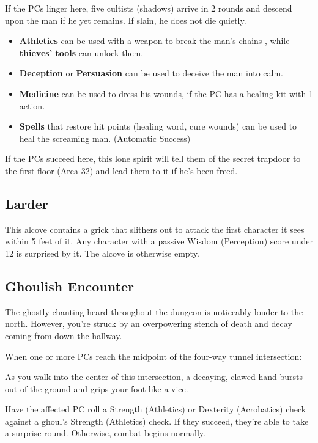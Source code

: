 If the PCs linger here, five cultists (shadows) arrive in 2 rounds and descend upon the man if he yet remains.
If slain, he does not die quietly.
\begin{skillChallenge}
  \begin{itemize}
    \item \textbf{Athletics} can be used with a weapon to break the man's chains \hardDC, while
    \textbf{thieves' tools} can unlock them. \moderateDC
    \item \textbf{Deception} or \textbf{Persuasion} can be used to deceive the man into calm. \moderateDC
    \item \textbf{Medicine} can be used to dress his wounds, if the PC has a healing kit with 1 action.
    \moderateDC
    \item \textbf{Spells} that restore hit points (healing word, cure wounds) can be used to heal the
    screaming man. (Automatic Success)
  \end{itemize}
\end{skillChallenge}
If the PCs succeed here, this lone spirit will tell them of the secret trapdoor to the first floor (Area 32)
and lead them to it if he's been freed.


\pagebreak
\subsection{Larder}
\label{sec:Larder}
This alcove contains a grick that slithers out to attack the first character it sees within 5 feet of it.
Any character with a passive Wisdom (Perception) score under 12 is surprised by it. The alcove is otherwise
empty.

\begin{arealinks}
\end{arealinks}


\pagebreak
\subsection{Ghoulish Encounter}
\label{sec:GhoulishEncounter}
\begin{readout}
  The ghostly chanting heard throughout the dungeon is noticeably louder to the north. However, you're struck
  by an overpowering stench of death and decay coming from down the hallway.
\end{readout}
When one or more PCs reach the midpoint of the four-way tunnel intersection:
\begin{readout}
  As you walk into the center of this intersection, a decaying, clawed hand bursts out of the ground and
  grips your foot like a vice.
\end{readout}
Have the affected PC roll a Strength (Athletics) or Dexterity (Acrobatics) check against a ghoul's Strength
(Athletics) check. If they succeed, they're able to take a surprise round. Otherwise, combat begins normally.

